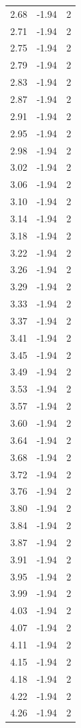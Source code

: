 \begin{longtable}{lrr}
  2.68 & -1.94 & 2 \\
  2.71 & -1.94 & 2 \\
  2.75 & -1.94 & 2 \\
  2.79 & -1.94 & 2 \\
  2.83 & -1.94 & 2 \\
  2.87 & -1.94 & 2 \\
  2.91 & -1.94 & 2 \\
  2.95 & -1.94 & 2 \\
  2.98 & -1.94 & 2 \\
  3.02 & -1.94 & 2 \\
  3.06 & -1.94 & 2 \\
  3.10 & -1.94 & 2 \\
  3.14 & -1.94 & 2 \\
  3.18 & -1.94 & 2 \\
  3.22 & -1.94 & 2 \\
  3.26 & -1.94 & 2 \\
  3.29 & -1.94 & 2 \\
  3.33 & -1.94 & 2 \\
  3.37 & -1.94 & 2 \\
  3.41 & -1.94 & 2 \\
  3.45 & -1.94 & 2 \\
  3.49 & -1.94 & 2 \\
  3.53 & -1.94 & 2 \\
  3.57 & -1.94 & 2 \\
  3.60 & -1.94 & 2 \\
  3.64 & -1.94 & 2 \\
  3.68 & -1.94 & 2 \\
  3.72 & -1.94 & 2 \\
  3.76 & -1.94 & 2 \\
  3.80 & -1.94 & 2 \\
  3.84 & -1.94 & 2 \\
  3.87 & -1.94 & 2 \\
  3.91 & -1.94 & 2 \\
  3.95 & -1.94 & 2 \\
  3.99 & -1.94 & 2 \\
  4.03 & -1.94 & 2 \\
  4.07 & -1.94 & 2 \\
  4.11 & -1.94 & 2 \\
  4.15 & -1.94 & 2 \\
  4.18 & -1.94 & 2 \\
  4.22 & -1.94 & 2 \\
  4.26 & -1.94 & 2 \\

\end{longtable}
